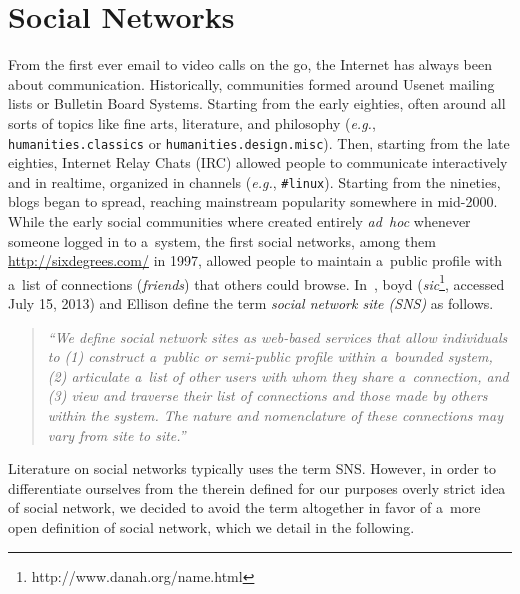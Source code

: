 \chapter{Social Networks}
\label{cha:social-networks}

\ifpdf
    \graphicspath{{3_social_networks/figures/PNG/}{3_social_networks/figures/PDF/}{3_social_networks/figures/}}
\else
    \graphicspath{{3_social_networks/figures/EPS/}{3_social_networks/figures/}}
\fi

From the first ever email to video calls on the go,
the Internet has always been about communication.
Historically, communities formed around Usenet mailing lists or Bulletin Board Systems.
Starting from the early eighties,
often around all sorts of topics like fine arts,
literature, and philosophy (\emph{e.g.}, \texttt{humanities.classics}
or \texttt{humanities.\-design.misc}).
Then, starting from the late eighties, Internet Relay Chats (IRC)
allowed people to communicate interactively and in realtime,
organized in channels (\emph{e.g.}, \texttt{\#linux}).
Starting from the nineties, blogs began to spread,
reaching mainstream popularity somewhere in mid-2000.
While the early social communities
where created entirely \emph{ad~hoc}
whenever someone logged in to a~system,
the first social networks,
among them \url{http://sixdegrees.com/} in 1997,
allowed people to maintain a~public profile
with a~list of connections (\emph{friends})
that others could browse.
In~\cite{boyd2007socialnetworksites}, boyd
(\emph{sic}\footnote{http://www.danah.org/name.html}, accessed July 15, 2013)
and Ellison define the term
\emph{social network site (SNS)} as follows.

\begin{quotation}
  \textit{``We define social network sites as web-based services
  that allow individuals to
  (1) construct a~public or
  semi-public profile within a~bounded system,
  (2) articulate a~list of other users
  with whom they share a~connection, and
  (3) view and traverse their list of connections
  and those made by others within the system.
  The nature and nomenclature of these connections
  may vary from site to site.''}
\end{quotation}

Literature on social networks typically uses the term SNS.
However, in order to differentiate ourselves
from the therein defined for our purposes overly strict
idea of social network,
we decided to avoid the term altogether in favor of a~more open
definition of social network,
which we detail in the following. 

